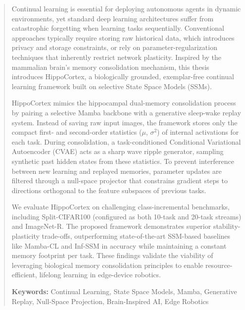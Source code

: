 
\begin{abstract}

Continual learning is essential for deploying autonomous agents in dynamic environments, yet standard deep learning architectures suffer from catastrophic forgetting when learning tasks sequentially. Conventional approaches typically require storing raw historical data, which introduces privacy and storage constraints, or rely on parameter-regularization techniques that inherently restrict network plasticity. Inspired by the mammalian brain's memory consolidation mechanism, this thesis introduces HippoCortex, a biologically grounded, exemplar-free continual learning framework built on selective State Space Models (SSMs). 

HippoCortex mimics the hippocampal dual-memory consolidation process by pairing a selective Mamba backbone with a generative sleep-wake replay system. Instead of saving raw input images, the framework stores only the compact first- and second-order statistics ($\mu$, $\sigma^2$) of internal activations for each task. During consolidation, a task-conditioned Conditional Variational Autoencoder (CVAE) acts as a sharp wave ripple generator, sampling synthetic past hidden states from these statistics. To prevent interference between new learning and replayed memories, parameter updates are filtered through a null-space projector that constrains gradient steps to directions orthogonal to the feature subspaces of previous tasks. 

We evaluate HippoCortex on challenging class-incremental benchmarks, including Split-CIFAR100 (configured as both 10-task and 20-task streams) and ImageNet-R. The proposed framework demonstrates superior stability-plasticity trade-offs, outperforming state-of-the-art SSM-based baselines like Mamba-CL and Inf-SSM in accuracy while maintaining a constant memory footprint per task. These findings validate the viability of leveraging biological memory consolidation principles to enable resource-efficient, lifelong learning in edge-device robotics.

\vspace{0.5cm}

\textbf{Keywords:} Continual Learning, State Space Models, Mamba, Generative Replay, Null-Space Projection, Brain-Inspired AI, Edge Robotics

\end{abstract}
